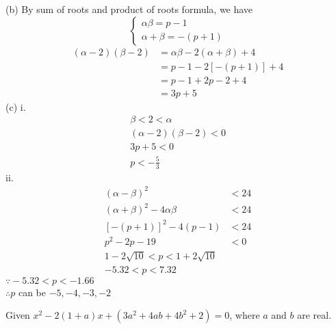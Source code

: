 \documentclass[addpoints, 10pt]{exam}
\begin{document}
\begin{questions}
\begin{solutionorlines}[16cm]
		(b) By sum of roots and product of roots formula, we have
		\begin{equation*}
			\begin{cases}
				\alpha \beta = p - 1 \\
				\alpha + \beta = -(p + 1) 
			\end{cases}
		\end{equation*}
		\begin{align*}
			(\alpha-2)(\beta-2) &= \alpha \beta - 2(\alpha + \beta) + 4 \\
								&= p - 1 - 2[-(p+1)] + 4 \\
								&= p - 1 + 2p - 2 + 4 \\
								&= 3p + 5 
		\end{align*}
		(c) i. 
			\begin{align*}
				\beta < 2 < \alpha \\
				(\alpha-2)(\beta-2) < 0 \\
				3p+5 < 0 \\
				p < -\tfrac{5}{3}
			\end{align*}
			ii. 
			\begin{align*}
				(\alpha-\beta)^2 &< 24 \\
				(\alpha+\beta)^2-4\alpha\beta &< 24 \\
				[-(p+1)]^2-4(p-1) &< 24 \\
				p^2-2p-19 &< 0 \\
				1-2\sqrt{10} < p < 1 + 2\sqrt{10}  \\
				-5.32 < p < 7.32
			\end{align*}
			 $\because -5.32 < p < -1.66$ \\
			 $\therefore p$ can be $-5,-4,-3,-2$
	\end{solutionorlines}

	\ifprintanswers
	\else
		\newpage
	\fi

	\question[6] Given $x^2-2(1+a)x+(3a^2+4ab+4b^2+2)=0$, where $a$ and $b$ are real.
\end{questions}
\end{document}
